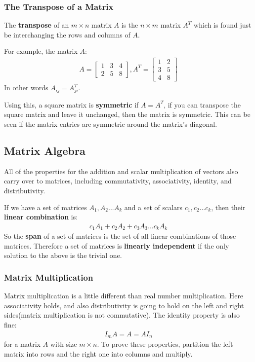 \documentclass{article}
\begin{document}
\subsubsection{The Transpose of a Matrix}
The \textbf{transpose} of an $m \times n$ matrix $A$ is the $n \times m$ matrix $A^T$ which is found just be interchanging the rows and columns of $A$.

For example, the matrix $A$:
\begin{gather*}
    A = \begin{bmatrix}
        1 & 3 & 4\\
        2 & 5 & 8
    \end{bmatrix},
    A^T = \begin{bmatrix}
        1 & 2\\
        3 & 5\\
        4 & 8
    \end{bmatrix}
\end{gather*}
In other words $A_{ij} = A^T_{ji}$.

Using this, a square matrix is \textbf{symmetric} if $A = A^T$, if you can transpose the square matrix and leave it unchanged, then the matrix is symmetric. This can be seen if the matrix entries are symmetric around the matrix's diagonal.
\subsection{Matrix Algebra}
All of the properties for the addition and scalar multiplication of vectors also carry over to matrices, including commutativity, associativity, identity, and distributivity.

If we have a set of matrices $A_1,A_2...A_k$ and a set of scalars $c_1,c_2...c_k$, then their \textbf{linear combination} is:
\begin{gather*}
    c_1A_1 + c_2A_2 + c_3A_3...c_kA_k
\end{gather*}
So the \textbf{span} of a set of matrices is the set of all linear combinations of those matrices. Therefore a set of matrices is \textbf{linearly independent} if the only solution to the above is the trivial one.
\subsubsection{Matrix Multiplication}
Matrix multiplication is a little different than real number multiplication. Here associativity holds, and also distributivity is going to hold on the left and right sides(matrix multiplication is not commutative). The identity property is also fine:
\begin{gather*}
    I_mA = A = AI_n
\end{gather*}
for a matrix $A$ with size $m \times n$. To prove these properties, partition the left matrix into rows and the right one into columns and multiply.
\end{document}
